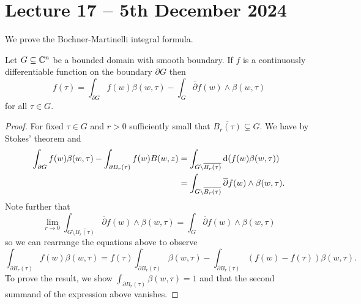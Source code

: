 \section{Lecture 17 -- 5th December 2024}\label{sec: lecture 17}
We prove the Bochner-Martinelli integral formula. 
\begin{theorem}\label{thm: Bochner-Martinelli integral}
    Let $G\subseteq\mathbb{C}^{n}$ be a bounded domain with smooth boundary. If $f$ is a continuously differentiable function on the boundary $\partial G$ then 
    $$f(\tau)=\int_{\partial G}f(w)\beta(w,\tau)-\int_{G}\overline{\partial}f(w)\wedge \beta(w,\tau)$$
    for all $\tau\in G$.
\end{theorem}
\begin{proof}
    For fixed $\tau\in G$ and $r>0$ sufficiently small that $\overline{B_{r}(\tau)}\subsetneq G$. We have by Stokes' theorem and 
    \begin{align*}
        \int_{\partial G}f(w)\beta(w,\tau)-\int_{\partial B_{r}(\tau)}f(w)B(w,z)&=\int_{G\setminus\overline{B_{r}(\tau)}}\mathrm{d}(f(w)\beta(w,\tau))\\
        &=\int_{G\setminus\overline{B_{r}(\tau)}}\overline{\partial}f(w)\wedge \beta(w,\tau).
    \end{align*}
    Note further that 
    $$\lim_{r\to 0}\int_{G\setminus\overline{B_{r}(\tau)}}\overline{\partial}f(w)\wedge \beta(w,\tau)=\int_{G}\overline{\partial}f(w)\wedge \beta(w,\tau)$$
    so we can rearrange the equations above to observe 
    $$\int_{\partial B_{r}(\tau)}f(w)\beta(w,\tau)=f(\tau)\int_{\partial B_{r}(\tau)}\beta(w,\tau)-\int_{\partial B_{r}(\tau)}(f(w)-f(\tau))\beta(w,\tau).$$ 
    To prove the result, we show $\int_{\partial B_{r}(\tau)}\beta(w,\tau)=1$ and that the second summand of the expression above vanishes.


\end{proof}
